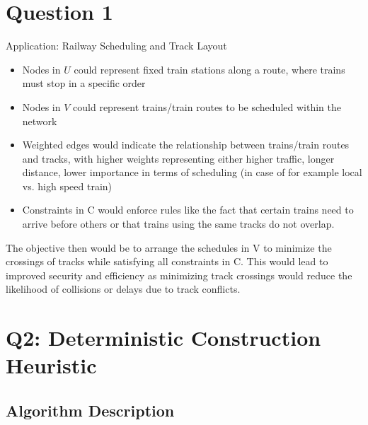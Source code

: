 \documentclass{article}
\begin{document}
\section*{Question 1}
Application: Railway Scheduling and Track Layout
\begin{itemize}
    \item Nodes in \(U\) could represent fixed train stations along a route, where trains must stop in a specific order
    \item Nodes in \(V\) could represent trains/train routes to be scheduled within the network
    \item Weighted edges would indicate the relationship between trains/train routes and tracks, with higher weights representing either higher traffic, longer distance, lower importance in terms of scheduling (in case of for example local vs. high speed train)
    \item Constraints in C would enforce rules like the fact that certain trains need to arrive before others or that trains using the same tracks do not overlap.
\end{itemize}

The objective then would be to arrange the schedules in V to minimize the crossings of tracks while satisfying all constraints in C. This would lead to improved security and efficiency as minimizing track crossings would reduce the likelihood of collisions or delays due to track conflicts.


\section*{Q2: Deterministic Construction Heuristic}

\subsection*{Algorithm Description}
\end{document}
